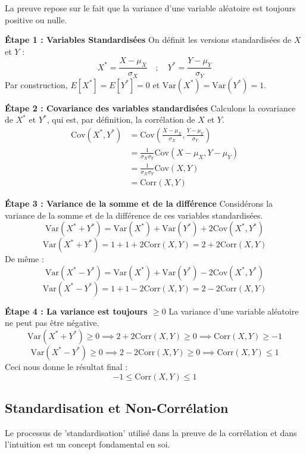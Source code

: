 \begin{proofbox}
La preuve repose sur le fait que la variance d'une variable aléatoire est toujours positive ou nulle.

\textbf{Étape 1 : Variables Standardisées}
On définit les versions standardisées de $X$ et $Y$ :
$$X^* = \frac{X - \mu_X}{\sigma_X} \quad ; \quad Y^* = \frac{Y - \mu_Y}{\sigma_Y}$$
Par construction, $E[X^*]=E[Y^*]=0$ et $\text{Var}(X^*) = \text{Var}(Y^*) = 1$.

\textbf{Étape 2 : Covariance des variables standardisées}
Calculons la covariance de $X^*$ et $Y^*$, qui est, par définition, la corrélation de $X$ et $Y$.
\begin{align*}
\text{Cov}(X^*, Y^*) &= \text{Cov}\left( \frac{X - \mu_X}{\sigma_X}, \frac{Y - \mu_Y}{\sigma_Y} \right) \\
&= \frac{1}{\sigma_X \sigma_Y} \text{Cov}(X - \mu_X, Y - \mu_Y) \\
&= \frac{1}{\sigma_X \sigma_Y} \text{Cov}(X, Y) \\
&= \text{Corr}(X,Y)
\end{align*}

\textbf{Étape 3 : Variance de la somme et de la différence}
Considérons la variance de la somme et de la différence de ces variables standardisées.
$$\text{Var}(X^* + Y^*) = \text{Var}(X^*) + \text{Var}(Y^*) + 2\text{Cov}(X^*, Y^*)$$
$$\text{Var}(X^* + Y^*) = 1 + 1 + 2\text{Corr}(X,Y) = 2 + 2\text{Corr}(X,Y)$$
De même :
$$\text{Var}(X^* - Y^*) = \text{Var}(X^*) + \text{Var}(Y^*) - 2\text{Cov}(X^*, Y^*)$$
$$\text{Var}(X^* - Y^*) = 1 + 1 - 2\text{Corr}(X,Y) = 2 - 2\text{Corr}(X,Y)$$

\textbf{Étape 4 : La variance est toujours $\ge 0$}
La variance d'une variable aléatoire ne peut pas être négative.
$$\text{Var}(X^* + Y^*) \ge 0 \implies 2 + 2\text{Corr}(X,Y) \ge 0 \implies \text{Corr}(X,Y) \ge -1$$
$$\text{Var}(X^* - Y^*) \ge 0 \implies 2 - 2\text{Corr}(X,Y) \ge 0 \implies \text{Corr}(X,Y) \le 1$$
Ceci nous donne le résultat final :
$$-1 \le \text{Corr}(X,Y) \le 1$$
\end{proofbox}

\subsection{Standardisation et Non-Corrélation}

Le processus de 'standardisation' utilisé dans la preuve de la corrélation et dans l'intuition est un concept fondamental en soi.

